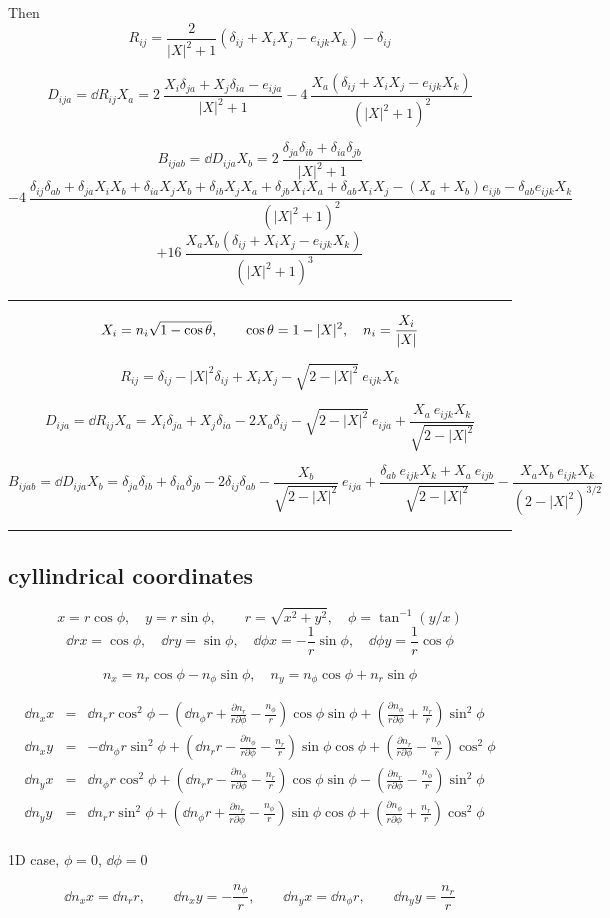\documentclass[a4paper]{article}
\begin{document}
Then
$$
R_{ij} = \frac{2}{|X|^2+1} (\delta_{ij} + X_i X_j  - e_{ijk} X_k)  - \delta_{ij}
$$

$$
D_{ija} = \dd{R_{ij}}{X_a} =
2\ \frac{X_i\delta_{ja} + X_j\delta_{ia} - e_{ija}}{|X|^2+1}
- 4\ \frac{X_a (\delta_{ij} + X_i X_j  - e_{ijk} X_k)}{(|X|^2+1)^2}
$$

$$
B_{ijab} = \dd{D_{ija}}{X_b} =
2\ \frac{\delta_{ja}\delta_{ib} + \delta_{ia}\delta_{jb}}{|X|^2+1}
$$
$$
- 4\ \frac{ \delta_{ij}\delta_{ab}+
\delta_{ja} X_i X_b + \delta_{ia} X_j X_b + \delta_{ib} X_j X_a + \delta_{jb} X_i X_a
 + \delta_{ab} X_i X_j - (X_a+X_b) e_{ijb} - \delta_{ab} e_{ijk} X_k
}{(|X|^2+1)^2}
$$
$$
+ 16\ \frac{X_aX_b (\delta_{ij} + X_i X_j  - e_{ijk} X_k)}{(|X|^2+1)^3}
$$

\medskip\hrule\medskip

$$
X_i = n_i \sqrt{1-\cos\theta}, \qquad
\cos\theta = 1-|X|^2,\quad
n_i = \frac{X_i}{|X|}
$$

$$
R_{ij} = \delta_{ij} - |X|^2\delta_{ij} + X_i X_j - \sqrt{2 - |X|^2}\ e_{ijk} X_k
$$

$$
D_{ija} = \dd{R_{ij}}{X_a} =
X_i \delta_{ja} + X_j \delta_{ia} - 2 X_a\delta_{ij}
- \sqrt{2 - |X|^2}\ e_{ija}
+ \frac{X_a\ e_{ijk} X_k}{\sqrt{2 - |X|^2}}
$$

$$
B_{ijab} = \dd{D_{ija}}{X_b} =
\delta_{ja}\delta_{ib} + \delta_{ia}\delta_{jb} - 2 \delta_{ij}\delta_{ab}
- \frac{X_b}{\sqrt{2 - |X|^2}}\ e_{ija}
+ \frac{\delta_{ab}\ e_{ijk} X_k + X_a\ e_{ijb}}{\sqrt{2 - |X|^2}}
- \frac{X_aX_b\ e_{ijk} X_k}{(2 - |X|^2)^{3/2}}
$$

\eject
\medskip\hrule\medskip

\subsection*{cyllindrical coordinates}

\def\nr{n_r}
\def\nf{n_\phi}
\def\cf{\cos\phi}
\def\sf{\sin\phi}
\def\cfs{\cos^2\phi}
\def\sfs{\sin^2\phi}
$$
x=r\cf,\quad
y=r\sf,\qquad
r = \sqrt{x^2+y^2},\quad
\phi = \tan^{-1}(y/x)
$$
$$
\dd{r}{x} = \cf,\quad
\dd{r}{y} = \sf,\quad
\dd{\phi}{x} = -\frac1{r}\sf,\quad
\dd{\phi}{y} = \frac1{r}\cf
$$

$$
n_x = \nr\cf - \nf\sf,\quad
n_y = \nf\cf + \nr\sf
$$

\def\ctan{{\rm ctan}}
\def\ddrf#1{\frac{\partial#1}{r\partial\phi}}

\begin{eqnarray*}
\dd{n_x}{x} &=&
  \dd{\nr}{r}\cfs
- (\dd{\nf}{r} + \ddrf{\nr} - \frac{\nf}{r}) \cf\sf
+ (\ddrf{\nf} + \frac{\nr}{r})\sfs
\\
\dd{n_x}{y} &=&
- \dd{\nf}{r}\sfs
+ (\dd{\nr}{r} - \ddrf{\nf} - \frac{\nr}{r})\sf\cf
+ (\ddrf{\nr} - \frac{\nf}{r})\cfs
\\
\dd{n_y}{x} &=&
  \dd{\nf}{r}\cfs
+ (\dd{\nr}{r} - \ddrf{\nf} - \frac{\nr}{r})\cf\sf
- (\ddrf{\nr} - \frac{\nf}{r})\sfs
\\
\dd{n_y}{y} &=&
  \dd{\nr}{r}\sfs
+ (\dd{\nf}{r} + \ddrf{\nr} - \frac{\nf}{r})\sf\cf
+ (\ddrf{\nf} + \frac{\nr}{r})\cfs
\\
\end{eqnarray*}

1D case, $\phi=0$, $\dd{}{\phi}=0$

$$
\dd{n_x}{x} = \dd{\nr}{r},\qquad
\dd{n_x}{y} = - \frac{\nf}{r},\qquad
\dd{n_y}{x} = \dd{\nf}{r},\qquad
\dd{n_y}{y} = \frac{\nr}{r}
$$
\end{document}
